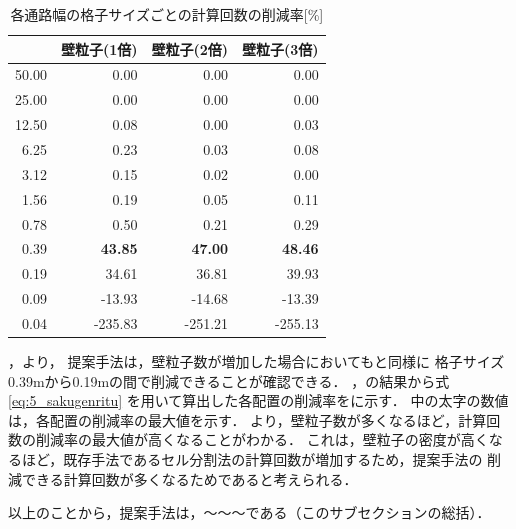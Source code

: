 \begin{table}[tb]
  \centering
  \caption{各通路幅の格子サイズごとの計算回数の削減率[\%]}
  \label{tb:5_bai_sakugenritu}
    \begin{tabular}{r|r|r|r}
    \hline \hline
		      & 壁粒子(1倍)    & 壁粒子(2倍)      & 壁粒子(3倍)        \\ \hline
		50.00 & 0.00           & 0.00             & 0.00               \\ \hline
		25.00 & 0.00           & 0.00             & 0.00               \\ \hline
		12.50 & 0.08           & 0.00             & 0.03               \\ \hline
		 6.25 & 0.23           & 0.03             & 0.08               \\ \hline
		 3.12 & 0.15           & 0.02             & 0.00               \\ \hline
		 1.56 & 0.19           & 0.05             & 0.11               \\ \hline
		 0.78 & 0.50           & 0.21             & 0.29               \\ \hline
		 0.39 & \textbf{43.85} & \textbf{47.00}   & \textbf{48.46}     \\ \hline
		 0.19 & 34.61          & 36.81            & 39.93              \\ \hline
		 0.09 & -13.93         & -14.68           & -13.39             \\ \hline
		 0.04 & -235.83        & -251.21          & -255.13            \\ \hline
    \end{tabular}
\end{table}

，より，
提案手法は，壁粒子数が増加した場合においてもと同様に
格子サイズ0.39mから0.19mの間で削減できることが確認できる．
，の結果から式\eqref{eq:5_sakugenritu}
を用いて算出した各配置の削減率をに示す．
中の太字の数値は，各配置の削減率の最大値を示す．
より，壁粒子数が多くなるほど，計算回数の削減率の最大値が高くなることがわかる．
これは，壁粒子の密度が高くなるほど，既存手法であるセル分割法の計算回数が増加するため，提案手法の
削減できる計算回数が多くなるためであると考えられる．

以上のことから，提案手法は，〜〜〜である（このサブセクションの総括）．

